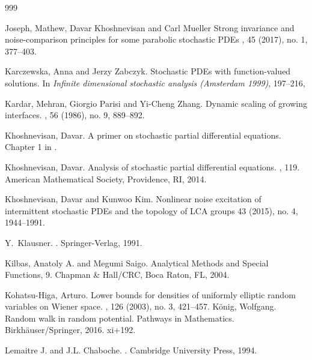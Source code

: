 \documentclass[a4paper,12pt]{article}
\theoremstyle{plain}
\theoremstyle{definition}
\begin{document}
\begin{thebibliography}{999}
	
Joseph, Mathew, Davar Khoshnevisan and Carl Mueller
\newblock Strong invariance and noise-comparison principles for some parabolic stochastic PDEs
, 45 (2017), no. 1, 377--403. 

 Karczewska, Anna and Jerzy Zabczyk. 
\newblock Stochastic PDEs with function-valued solutions. 
\newblock In {\it Infinite dimensional stochastic analysis (Amsterdam 1999)}, 197--216,

Kardar, Mehran, Giorgio Parisi and Yi-Cheng Zhang.
\newblock Dynamic scaling of growing interfaces.
, 56 (1986), no. 9, 889--892.

Khoshnevisan, Davar.
\newblock A primer on stochastic partial differential equations.
\newblock Chapter 1 in \cite{DalangEtc08Minicourse}.

Khoshnevisan, Davar.
\newblock Analysis of stochastic partial differential equations.
, 119. 
\newblock American Mathematical Society, Providence, RI, 2014.

  Khoshnevisan, Davar and Kunwoo Kim.
\newblock Nonlinear noise excitation of intermittent stochastic PDEs and the topology of LCA groups
 43 (2015), no. 4, 1944--1991.  

Y.~Klausner.
.
\newblock Springer-Verlag, 1991.

Kilbas, Anatoly A. and Megumi Saigo.
\newblock Analytical Methods and Special Functions, 9. Chapman \& Hall/CRC, Boca Raton, FL, 2004.

Kohatsu-Higa, Arturo.
\newblock Lower bounds for densities of uniformly elliptic random variables on Wiener space. 
, 126 (2003), no. 3, 421--457.
% 
K\"onig, Wolfgang.
\newblock Random walk in random potential. Pathways in Mathematics. Birkh\"auser/Springer, 2016. xi+192. 


Lemaitre J. and J.L. Chaboche.
.
\newblock Cambridge University Press, 1994.


\end{thebibliography}
\end{document}
